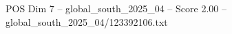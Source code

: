 \begin{textsample}{POS Dim 7 – global\_south\_2025\_04 – Score 2.00 – global\_south\_2025\_04/123392106.txt}
\end{textsample}
